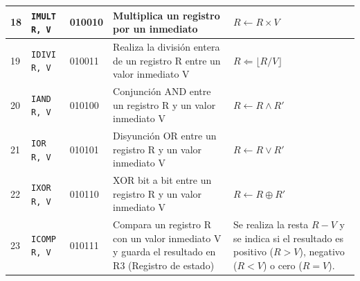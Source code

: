 \documentclass{article}
\begin{document}
\begin{longtable}{|p{}|p{}|p{}|p{}|p{}|}
  \hline
  18              & \texttt{IMULT R, V}  & 010010                          & Multiplica un registro por un inmediato                                                                                                                                                       & $R \leftarrow R \times V$                                                                                           \\
  \hline
  19              & \texttt{IDIVI R, V}  & 010011                          & Realiza la división entera de un registro R entre un valor inmediato V                                                                                                                        & $R \Leftarrow \lfloor R / V \rfloor $                                                                               \\
  \hline
  20              & \texttt{IAND R, V}   & 010100                          & Conjunción AND entre un registro R y un valor inmediato V                                                                                                                                     & $ R \leftarrow R \wedge R'$                                                                                         \\
  \hline
  21              & \texttt{IOR R, V}    & 010101                          & Disyunción OR entre un registro R y un valor inmediato V                                                                                                                                      & $R \leftarrow R \vee R'$                                                                                            \\
  \hline
  22              & \texttt{IXOR R, V}   & 010110                          & XOR bit a bit entre un registro R y un valor inmediato V                                                                                                                                      & $R \leftarrow R \oplus R'$                                                                                          \\
  \hline
  23              & \texttt{ICOMP R, V}  & 010111                          & Compara un registro R con un valor inmediato V y guarda el resultado en R3 (Registro de estado)                                                                                               & Se realiza la resta $R - V$ y se indica si el resultado es positivo ($R > V$), negativo ($R < V$) o cero ($R = V$). \\

\end{longtable}
\end{document}
